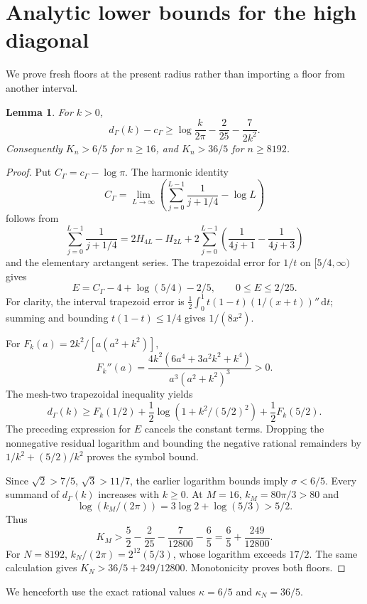 \documentclass[11pt]{article}
\newtheorem{lemma}{Lemma}
\newcommand{\dd}{\,\mathrm d}
\begin{document}
\section{Analytic lower bounds for the high diagonal}
We prove fresh floors at the present radius rather than importing a floor from another interval.
\begin{lemma}
For $k>0$,
\[
 d_\Gamma(k)-c_\Gamma\ge\log\frac{k}{2\pi}-\frac2{25}-\frac7{2k^2}.
\]
Consequently $K_n>6/5$ for $n\ge16$, and $K_n>36/5$ for $n\ge8192$.
\end{lemma}
\begin{proof}
Put $C_\Gamma=c_\Gamma-\log\pi$. The harmonic identity
\[
 C_\Gamma=\lim_{L\to\infty}\left(\sum_{j=0}^{L-1}\frac1{j+1/4}-\log L\right)
\]
follows from
\[
 \sum_{j=0}^{L-1}\frac1{j+1/4}=2H_{4L}-H_{2L}
 +2\sum_{j=0}^{L-1}\left(\frac1{4j+1}-\frac1{4j+3}\right)
\]
and the elementary arctangent series. The trapezoidal error for $1/t$ on $[5/4,\infty)$ gives
\[
 E=C_\Gamma-4+\log(5/4)-2/5,\qquad 0\le E\le2/25.
\]
For clarity, the interval trapezoid error is
$\frac12\int_0^1t(1-t)(1/(x+t))''\dd t$; summing and bounding $t(1-t)\le1/4$ gives $1/(8x^2)$.

For $F_k(a)=2k^2/[a(a^2+k^2)]$,
\[
 F_k''(a)=\frac{4k^2(6a^4+3a^2k^2+k^4)}{a^3(a^2+k^2)^3}>0.
\]
The mesh-two trapezoidal inequality yields
\[
 d_\Gamma(k)\ge F_k(1/2)+\frac12\log(1+k^2/(5/2)^2)+\frac12F_k(5/2).
\]
The preceding expression for $E$ cancels the constant terms. Dropping the nonnegative residual logarithm and bounding the negative rational remainders by $1/k^2+(5/2)/k^2$ proves the symbol bound.

Since $\sqrt2>7/5$, $\sqrt3>11/7$, the earlier logarithm bounds imply $\sigma<6/5$. Every summand of $d_\Gamma(k)$ increases with $k\ge0$. At $M=16$, $k_M=80\pi/3>80$ and
\[
 \log(k_M/(2\pi))=3\log2+\log(5/3)>5/2.
\]
Thus
\[
 K_M>\frac52-\frac2{25}-\frac7{12800}-\frac65
       =\frac65+\frac{249}{12800}.
\]
For $N=8192$, $k_N/(2\pi)=2^{12}(5/3)$, whose logarithm exceeds $17/2$. The same calculation gives
$K_N>36/5+249/12800$. Monotonicity proves both floors.
\end{proof}
We henceforth use the exact rational values $\kappa=6/5$ and $\kappa_N=36/5$.
\end{document}
